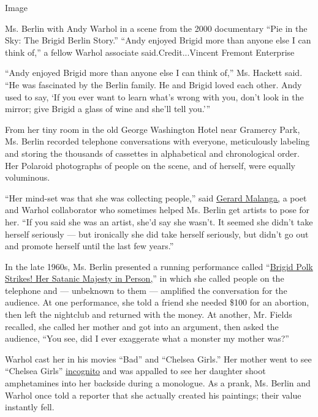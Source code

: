 Image

Ms. Berlin with Andy Warhol in a scene from the 2000 documentary ``Pie
in the Sky: The Brigid Berlin Story.'' ``Andy enjoyed Brigid more than
anyone else I can think of,'' a fellow Warhol associate
said.Credit...Vincent Fremont Enterprise

``Andy enjoyed Brigid more than anyone else I can think of,'' Ms.
Hackett said. ``He was fascinated by the Berlin family. He and Brigid
loved each other. Andy used to say, `If you ever want to learn what's
wrong with you, don't look in the mirror; give Brigid a glass of wine
and she'll tell you.'''

From her tiny room in the old George Washington Hotel near Gramercy
Park, Ms. Berlin recorded telephone conversations with everyone,
meticulously labeling and storing the thousands of cassettes in
alphabetical and chronological order. Her Polaroid photographs of people
on the scene, and of herself, were equally voluminous.

``Her mind-set was that she was collecting people,'' said
\href{https://www.interviewmagazine.com/art/gerard-malanga-adam-kimmel}{Gerard
Malanga,} a poet and Warhol collaborator who sometimes helped Ms. Berlin
get artists to pose for her. ``If you said she was an artist, she'd say
she wasn't. It seemed she didn't take herself seriously --- but
ironically she did take herself seriously, but didn't go out and promote
herself until the last few years.''

In the late 1960s, Ms. Berlin presented a running performance called
``\href{http://www.andypresentsnothingspecial.com/interviews/brigid-berlin.html\#:~:text=After\%20moving\%20to\%20the\%20Chelsea,Her\%20Satanic\%20Majesty\%20in\%20Person.}{Brigid
Polk Strikes! Her Satanic Majesty in Person,}'' in which she called
people on the telephone and --- unbeknown to them --- amplified the
conversation for the audience. At one performance, she told a friend she
needed \$100 for an abortion, then left the nightclub and returned with
the money. At another, Mr. Fields recalled, she called her mother and
got into an argument, then asked the audience, ``You see, did I ever
exaggerate what a monster my mother was?''

Warhol cast her in his movies ``Bad'' and ``Chelsea Girls.'' Her mother
went to see ``Chelsea Girls''
\href{https://www.nytimes.com/1996/03/07/garden/warhol-star-is-back-for-15-more-minutes.html}{incognito}
and was appalled to see her daughter shoot amphetamines into her
backside during a monologue. As a prank, Ms. Berlin and Warhol once told
a reporter that she actually created his paintings; their value
instantly fell.

